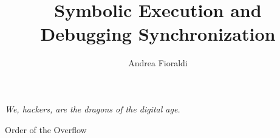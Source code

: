 \documentclass[Lau,binding=0.6cm]{sapthesis}
\title{Symbolic Execution and \\Debugging Synchronization}
\author{Andrea Fioraldi}
\begin{document}
\frontmatter

\maketitle

\clearpage

\textit{We, hackers, are the dragons of the digital age.}

Order of the Overflow

\clearpage

\tableofcontents

\clearpage



\mainmatter







\newpage
{}

 

\end{document}
